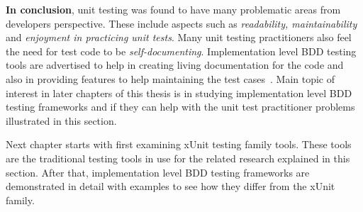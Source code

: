     \textbf{In conclusion}, unit testing was found to have many problematic areas from developers perspective.
    These include aspects such as \textit{readability,
    maintainability} and \textit{enjoyment in practicing unit tests}. Many unit testing practitioners also feel the need for
    test code to be \textit{self-documenting}. Implementation level BDD testing tools are advertised to
    help in creating living documentation for the code and also in providing features to help maintaining the test cases~\cite{smart2014bdd}.
    Main topic of interest in later chapters of this thesis is in studying implementation level BDD testing frameworks and
    if they can help with the unit test practitioner problems illustrated in this section.

    Next chapter starts with first examining xUnit testing family tools. These tools are the traditional testing tools in use for the
    related research explained in this section. After that, implementation level BDD testing frameworks are demonstrated in detail
    with examples to see how they differ from the xUnit family.




